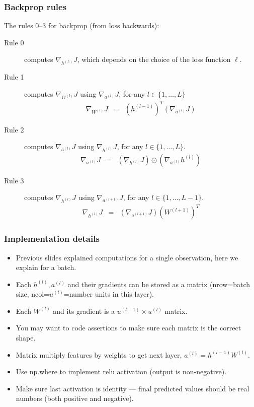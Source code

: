 \documentclass{beamer}
\begin{document}
\begin{frame}
  \frametitle{Backprop rules}
  The rules 0--3 for backprop (from loss backwards):
\begin{description}
\item[Rule 0] computes $\nabla_{h^{(L)}} J$, which depends on the
  choice of the loss function $\ell$.
\item[Rule 1] computes
  $\nabla_{W^{(l)}} J$ using $\nabla_{a^{(l)}} J$, for any $l\in\{1,\dots,L\}$
\begin{eqnarray}
  \nabla_{W^{(l)}} J
  &=& \left( h^{(l-1)} \right)^T
      \left(\nabla_{a^{(l)}} J\right)
       \label{eq:grad-loss-w}
\end{eqnarray}
\item[Rule 2] computes
  $\nabla_{a^{(l)}} J$ using $\nabla_{h^{(l)}} J$, for any $l\in\{1,\dots,L\}$.
\begin{eqnarray}
  \nabla_{a^{(l)}} J
  &=& \left(\nabla_{h^{(l)}} J\right) \odot
      \label{eq:grad-loss-a}
      \left(\nabla_{a^{(l)}} h^{(l)} \right) 
\end{eqnarray}
\item[Rule 3] computes
  $\nabla_{h^{(l)}} J$ using $\nabla_{a^{(l+1)}} J$, for any $l\in\{1,\dots,L-1\}$.
\begin{eqnarray}
  \nabla_{h^{(l)}} J
  &=& \left(\nabla_{a^{(l+1)}} J\right)
      \left(W^{(l+1)}\right)^T \label{eq:grad-loss-h}
\end{eqnarray}
\end{description}

\end{frame}

\begin{frame}
  \frametitle{Implementation details}
  \begin{itemize}
  \item Previous slides explained computations for a single
    observation, here we explain for a batch.
  \item Each $h^{(l)},a^{(l)}$ and their gradients can be stored as a
    matrix (nrow=batch size, ncol=$u^{(l)}$=number units in this layer).
  \item Each $W^{(l)}$ and its gradient is a $u^{(l-1)}\times u^{(l)}$
    matrix.
  \item You may want to code assertions to make sure each matrix is
    the correct shape.
  \item Matrix multiply features by weights to get next layer,
    $a^{(l)}=h^{(l-1)} W^{(l)}$.
  \item Use np.where to implement relu activation (output is
    non-negative).
  \item Make sure last activation is identity --- final predicted
    values should be real numbers (both positive and negative).
  \end{itemize}
\end{frame}
\end{document}
